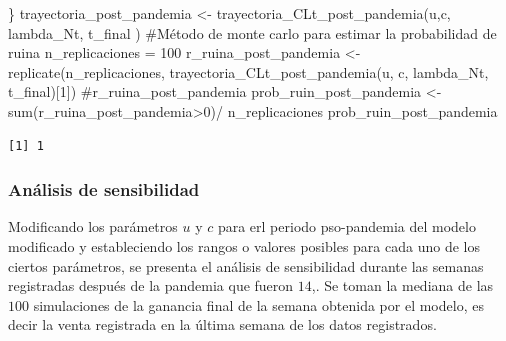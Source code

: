 \documentclass[
  us-letterpaper,
]{scrreprt}
\newenvironment{Shaded}{\begin{snugshade}}{\end{snugshade}}
\newcommand{\CommentTok}[1]{\textcolor[rgb]{0.37,0.37,0.37}{#1}}
\newcommand{\DecValTok}[1]{\textcolor[rgb]{0.68,0.00,0.00}{#1}}
\newcommand{\FunctionTok}[1]{\textcolor[rgb]{0.28,0.35,0.67}{#1}}
\newcommand{\NormalTok}[1]{\textcolor[rgb]{0.00,0.23,0.31}{#1}}
\newcommand{\OtherTok}[1]{\textcolor[rgb]{0.00,0.23,0.31}{#1}}
\newcommand{\SpecialCharTok}[1]{\textcolor[rgb]{0.37,0.37,0.37}{#1}}
\theoremstyle{plain}
\theoremstyle{plain}
\theoremstyle{definition}
\theoremstyle{remark}
\begin{document}
\begin{Shaded}
\begin{Highlighting}[]
\NormalTok{\}}
\NormalTok{trayectoria\_post\_pandemia }\OtherTok{\textless{}{-}} \FunctionTok{trayectoria\_CLt\_post\_pandemia}\NormalTok{(u,c,}
\NormalTok{                                            lambda\_Nt, t\_final )}
\CommentTok{\#Método de monte carlo para estimar la probabilidad de ruina}
\NormalTok{n\_replicaciones }\OtherTok{=} \DecValTok{100}
\NormalTok{r\_ruina\_post\_pandemia }\OtherTok{\textless{}{-}} \FunctionTok{replicate}\NormalTok{(n\_replicaciones,}
                          \FunctionTok{trayectoria\_CLt\_post\_pandemia}\NormalTok{(u, c, }
\NormalTok{                                          lambda\_Nt, t\_final)[}\DecValTok{1}\NormalTok{])}
\CommentTok{\#r\_ruina\_post\_pandemia}
\NormalTok{prob\_ruin\_post\_pandemia }\OtherTok{\textless{}{-}} \FunctionTok{sum}\NormalTok{(r\_ruina\_post\_pandemia}\SpecialCharTok{\textgreater{}}\DecValTok{0}\NormalTok{)}\SpecialCharTok{/}
\NormalTok{n\_replicaciones}
\NormalTok{prob\_ruin\_post\_pandemia}
\end{Highlighting}
\end{Shaded}

\begin{verbatim}
[1] 1
\end{verbatim}

\subsubsection{Análisis de
sensibilidad}\label{anuxe1lisis-de-sensibilidad-1}

Modificando los parámetros \(u\) y \(c\) para erl periodo pso-pandemia
del modelo modificado y estableciendo los rangos o valores posibles para
cada uno de los ciertos parámetros, se presenta el análisis de
sensibilidad durante las semanas registradas después de la pandemia que
fueron \(14\),. Se toman la mediana de las \(100\) simulaciones de la
ganancia final de la semana obtenida por el modelo, es decir la venta
registrada en la última semana de los datos registrados.
\end{document}
